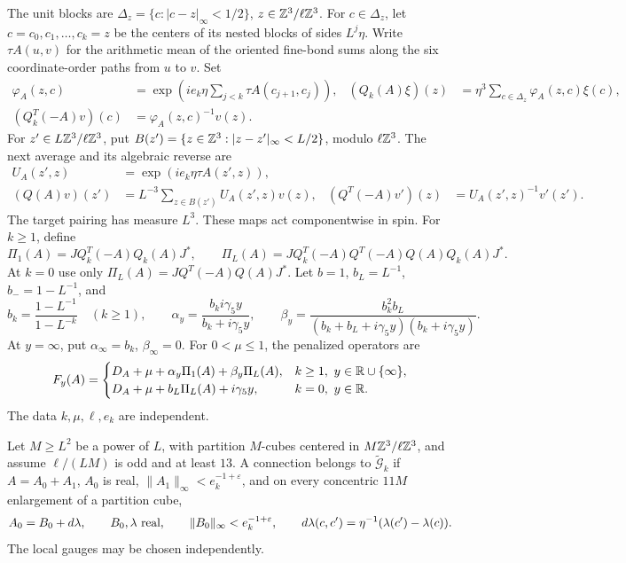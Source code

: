 The unit blocks are
\(\Delta_z=\{c:|c-z|_\infty<1/2\}\), \(z\in\mathbb Z^3/\ell\mathbb Z^3\).
For \(c\in\Delta_z\), let \(c=c_0,c_1,\ldots,c_k=z\) be the
centers of its nested blocks of sides \(L^j\eta\).
Write \(\tau A(u,v)\) for the arithmetic mean of the oriented
fine-bond sums along the six coordinate-order paths from \(u\) to \(v\).
Set
\[
 \begin{aligned}
 \varphi_A(z,c)&=\exp\!\left(ie_k\eta
                    \sum_{j<k}\tau A(c_{j+1},c_j)\right),&
 (Q_k(A)\xi)(z)&=\eta^3\sum_{c\in\Delta_z}\varphi_A(z,c)\xi(c),\\
 (Q_k^T(-A)v)(c)&=\varphi_A(z,c)^{-1}v(z).&&
 \end{aligned}
\]
For \(z'\in L\mathbb Z^3/\ell\mathbb Z^3\), put
\(B(z')=\{z\in\mathbb Z^3:|z-z'|_\infty<L/2\}\), modulo \(\ell\mathbb Z^3\).
The next average and its algebraic reverse are
\[
 \begin{aligned}
 U_A(z',z)&=\exp(ie_k\eta\tau A(z',z)),\\
 (Q(A)v)(z')&=L^{-3}\sum_{z\in B(z')}U_A(z',z)v(z),&
 (Q^T(-A)v')(z)&=U_A(z',z)^{-1}v'(z').
 \end{aligned}
\]
The target pairing has measure \(L^3\). These maps act componentwise
in spin. For \(k\ge1\), define
\[
 \Pi_1(A)=JQ_k^T(-A)Q_k(A)J^*,\qquad
 \Pi_L(A)=JQ_k^T(-A)Q^T(-A)Q(A)Q_k(A)J^*.
\]
At \(k=0\) use only \(\Pi_L(A)=JQ^T(-A)Q(A)J^*\).
Let \(b=1\), \(b_L=L^{-1}\), \(b_-=1-L^{-1}\), and
\[
 b_k=\frac{1-L^{-1}}{1-L^{-k}}\quad(k\ge1),\qquad
 \alpha_y=\frac{b_ki\gamma_5y}{b_k+i\gamma_5y},\qquad
 \beta_y=\frac{b_k^2b_L}{(b_k+b_L+i\gamma_5y)(b_k+i\gamma_5y)}.
\]
At \(y=\infty\), put \(\alpha_\infty=b_k\), \(\beta_\infty=0\).
For \(0<\mu\le1\), the penalized operators are
\begin{equation}\label{eq:intro-penalized-operator}
 F_y(A)=
 \begin{cases}
 D_A+\mu+\alpha_y\Pi_1(A)+\beta_y\Pi_L(A),
      & k\ge1,\ y\in\mathbb R\cup\{\infty\},\\
 D_A+\mu+b_L\Pi_L(A)+i\gamma_5y,
      & k=0,\ y\in\mathbb R.
 \end{cases}
\end{equation}
The data \(k,\mu,\ell,e_k\) are independent.

Let \(M\ge L^2\) be a power of \(L\), with partition \(M\)-cubes
centered in \(M\mathbb Z^3/\ell\mathbb Z^3\), and assume \(\ell/(LM)\) is odd
and at least \(13\). A connection belongs to
\(\widetilde{\mathcal G}_k\) if \(A=A_0+A_1\), \(A_0\) is real,
\(\|A_1\|_\infty<e_k^{-1+\varepsilon}\), and on every concentric
\(11M\) enlargement of a partition cube,
\[
 A_0=B_0+d\lambda,\qquad B_0,\lambda\ \hbox{real},\qquad
 \|B_0\|_\infty<e_k^{-1+\varepsilon},\qquad
 d\lambda(c,c')=\eta^{-1}(\lambda(c')-\lambda(c)).
\]
The local gauges may be chosen independently.

